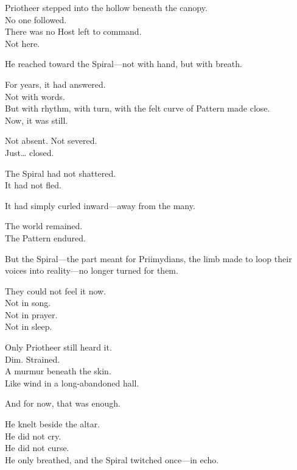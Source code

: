 \documentclass[12pt]{article}
\begin{document}
\vspace{0.5em}
Priotheer stepped into the hollow beneath the canopy.\\
No one followed.\\
There was no Host left to command.\\
Not here.

\vspace{0.5em}
He reached toward the Spiral---not with hand, but with breath.

\vspace{0.5em}
For years, it had answered.\\
Not with words.\\
But with rhythm, with turn, with the felt curve of Pattern made close.\\
Now, it was still.

\vspace{0.5em}
Not absent. Not severed.\\
Just\ldots{} closed.

\vspace{0.5em}
The Spiral had not shattered.\\
It had not fled.

\vspace{0.5em}
It had simply curled inward---away from the many.

\vspace{0.5em}
The world remained.\\
The Pattern endured.

\vspace{0.5em}
But the Spiral---the part meant for Priimydians, the limb made to loop their voices into reality---no longer turned for them.

\vspace{0.5em}
They could not feel it now.\\
Not in song.\\
Not in prayer.\\
Not in sleep.

\vspace{0.5em}
Only Priotheer still heard it.\\
Dim. Strained.\\
A murmur beneath the skin.\\
Like wind in a long-abandoned hall.

\vspace{0.5em}
And for now, that was enough.

\vspace{0.5em}
He knelt beside the altar.\\
He did not cry.\\
He did not curse.\\
He only breathed, and the Spiral twitched once---in echo.
\end{document}
